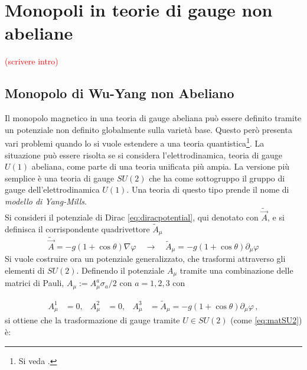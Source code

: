 \chapter{Monopoli in teorie di gauge non abeliane}
\textcolor{red}{(scrivere intro)}\\
%
\section{Monopolo di Wu-Yang non Abeliano}
Il monopolo magnetico in una teoria di gauge abeliana può essere definito tramite
un potenziale non definito globalmente sulla varietà base. Questo però presenta
vari problemi quando lo si vuole estendere a una teoria quantistica\footnote{
   Si veda \cite{nakahara}.
}.
La situazione può essere risolta se si considera l'elettrodinamica, teoria
di gauge $U(1)$ abeliana, come parte di una teoria unificata più ampia. La versione
più semplice è una teoria di gauge $SU(2)$ che ha come sottogruppo il gruppo
di gauge dell'elettrodinamica $U(1)$. Una teoria di questo tipo prende il nome
di \emph{modello di Yang-Mills}. \\


Si consideri il potenziale di Dirac \ref{eq:diracpotential}, qui denotato con
$\tilde{\vec A}$, e si definisca il corrispondente quadrivettore $\tilde{A}_\mu$
$$
   \tilde{\vec A} = -g(1 + \cos\theta) \nabla \varphi
   \quad \to \quad
   \tilde{A}_\mu = -g(1 + \cos\theta) \partial_\mu \varphi
$$
Si vuole costruire ora un potenziale generalizzato, che trasformi attraverso
gli elementi di $SU(2)$.
Definendo il potenziale $A_\mu$ tramite una combinazione delle matrici di Pauli,
$A_\mu := A_\mu^a \sigma_a/2$ con $a = 1,2,3$ con

\begin{equation}\label{eq:wuyangpotential}
   \begin{aligned}
      A_\mu^1 &= 0, & A_\mu^2 &= 0, & A_\mu^3 &= \tilde{A}_\mu =
         -g(1 + \cos\theta) \partial_\mu \varphi \, ,
   \end{aligned}
\end{equation}
si ottiene che la trasformazione di gauge tramite $U \in SU(2)$ (come \ref{eq:matSU2})
è:

